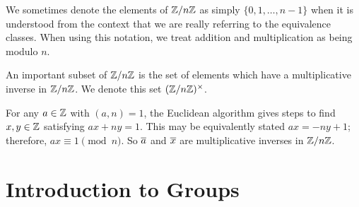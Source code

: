 \documentclass[10pt, oneside]{article}
\begin{document}
We sometimes denote the elements of $\mathbb{Z}/n\mathbb{Z}$ as simply $\{0, 1, \dots, n-1\}$ when it is understood from the context that we are really referring to the equivalence classes. When using this notation, we treat addition and multiplication as being modulo $n$.

An important subset of $\mathbb{Z}/n\mathbb{Z}$ is the set of elements which have a multiplicative inverse in $\mathbb{Z}/n\mathbb{Z}$. We denote this set $(\mathbb{Z}/n\mathbb{Z})^\times$.

For any $a\in\mathbb{Z}$ with $(a,n)=1$, the Euclidean algorithm gives steps to find $x,y\in \mathbb{Z}$ satisfying $ax+ny=1$. This may be equivalently stated $ax = -ny + 1$; therefore, $ax\equiv 1\pmod{n}$. So $\overline{a}$ and $\overline{x}$ are multiplicative inverses in $\mathbb{Z}/n\mathbb{Z}$.

\section{Introduction to Groups}
\end{document}
